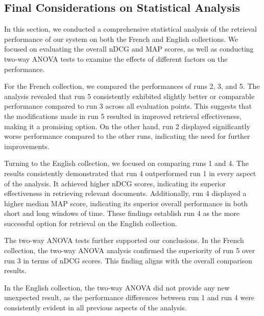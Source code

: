 \newpage
\enlargethispage{4\baselineskip}
\subsection{Final Considerations on Statistical Analysis}

In this section, we conducted a comprehensive statistical analysis of the retrieval performance of our system on both the French and English collections. 
We focused on evaluating the overall \ac{nDCG} and \ac{MAP} scores, as well as conducting two-way \ac{ANOVA} tests to examine the effects of different factors on the performance.

For the French collection, we compared the performances of runs 2, 3, and 5. 
The analysis revealed that run 5 consistently exhibited slightly better or comparable performance compared to run 3 across all evaluation points. 
This suggests that the modifications made in run 5 resulted in improved retrieval effectiveness, making it a promising option. 
On the other hand, run 2 displayed significantly worse performance compared to the other runs, indicating the need for further improvements.

Turning to the English collection, we focused on comparing runs 1 and 4. 
The results consistently demonstrated that run 4 outperformed run 1 in every aspect of the analysis. 
It achieved higher \ac{nDCG} scores, indicating its superior effectiveness in retrieving relevant documents. 
Additionally, run 4 displayed a higher median \ac{MAP} score, indicating its superior overall performance in both short and long windows of time. 
These findings establish run 4 as the more successful option for retrieval on the English collection.

The two-way \ac{ANOVA} tests further supported our conclusions. 
In the French collection, the two-way \ac{ANOVA} analysis confirmed the superiority of run 5 over run 3 in terms of \ac{nDCG} scores. 
This finding aligns with the overall comparison results. 

In the English collection, the two-way \ac{ANOVA} did not provide any new unexpected result, as the performance differences between run 1 and run 4 were consistently evident in all previous aspects of the analysis.


